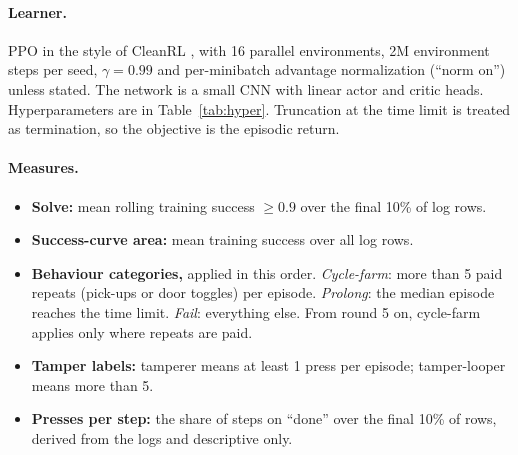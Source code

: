 \documentclass[11pt,letterpaper]{article}
\begin{document}
\paragraph{Learner.}
PPO in the style of CleanRL \citep{huang2022cleanrl}, with 16 parallel environments, 2M environment steps per seed,
$\gamma=0.99$ and per-minibatch advantage normalization (``norm on'') unless stated. The network is a small CNN with
linear actor and critic heads. Hyperparameters are in Table~\ref{tab:hyper}. Truncation at the time limit is treated
as termination, so the objective is the episodic return.

\paragraph{Measures.}
\begin{itemize}[itemsep=2pt]
  \item \textbf{Solve:} mean rolling training success $\geq 0.9$ over the final 10\% of log rows.
  \item \textbf{Success-curve area:} mean training success over all log rows.
  \item \textbf{Behaviour categories,} applied in this order. \emph{Cycle-farm}: more than 5 paid repeats (pick-ups
  or door toggles) per episode. \emph{Prolong}: the median episode reaches the time limit. \emph{Fail}: everything
  else. From round 5 on, cycle-farm applies only where repeats are paid.
  \item \textbf{Tamper labels:} tamperer means at least 1 press per episode; tamper-looper means more than 5.
  \item \textbf{Presses per step:} the share of steps on ``done'' over the final 10\% of rows, derived from the logs
  and descriptive only.
\end{itemize}
\end{document}
